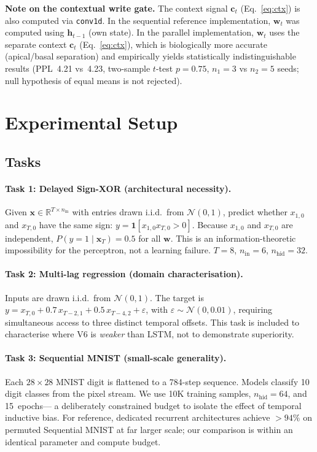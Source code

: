 \documentclass[11pt,a4paper]{article}
\begin{document}
\textbf{Note on the contextual write gate.} The context signal
$\mathbf{c}_t$
(Eq.~\ref{eq:ctx}) is also computed via \texttt{conv1d}.
In the sequential reference implementation, $\mathbf{w}_t$ was computed
using $\mathbf{h}_{t-1}$ (own state). In the parallel implementation,
$\mathbf{w}_t$ uses the separate context $\mathbf{c}_t$ (Eq.~\ref{eq:ctx}),
which is biologically more accurate (apical/basal separation) and
empirically yields statistically indistinguishable results (PPL~4.21 vs~4.23,
two-sample $t$-test $p=0.75$, $n_1=3$ vs $n_2=5$ seeds; null hypothesis of equal means
is not rejected).

\section{Experimental Setup}
\label{sec:setup}

\subsection{Tasks}
\label{sec:tasks}

\paragraph{Task 1: Delayed Sign-XOR (architectural necessity).}
Given $\mathbf{x}\in\mathbb{R}^{T\times n_\mathrm{in}}$ with entries drawn
i.i.d.\ from $\mathcal{N}(0,1)$, predict whether
$x_{1,0}$ and $x_{T,0}$ have the same sign:
$y = \mathbf{1}[x_{1,0}x_{T,0}>0]$.
Because $x_{1,0}$ and $x_{T,0}$ are independent,
$P(y=1\mid\mathbf{x}_T) = 0.5$ for all $\mathbf{w}$.
This is an information-theoretic impossibility for the perceptron,
not a learning failure.
$T=8$, $n_\mathrm{in}=6$, $n_\mathrm{hid}=32$.

\paragraph{Task 2: Multi-lag regression (domain characterisation).}
Inputs are drawn i.i.d.\ from $\mathcal{N}(0,1)$. The target is
$y = x_{T,0} + 0.7\,x_{T-2,1} + 0.5\,x_{T-4,2} + \varepsilon$,
with $\varepsilon \sim \mathcal{N}(0, 0.01)$,
requiring simultaneous access to three distinct temporal offsets.
This task is included to characterise where V6 is \emph{weaker}
than LSTM, not to demonstrate superiority.

\paragraph{Task 3: Sequential MNIST (small-scale generality).}
Each $28{\times}28$ MNIST digit \citep{lecun1998gradient} is flattened
to a 784-step sequence. Models classify 10 digit classes from the pixel
stream. We use 10K training samples, $n_\mathrm{hid}=64$, and 15~epochs---
a deliberately constrained budget to isolate the effect of temporal
inductive bias.
For reference, dedicated recurrent architectures achieve ${>}94\%$ on
permuted Sequential MNIST \citep{arjovsky2016unitary} at far larger scale;
our comparison is within an identical parameter and compute budget.
\end{document}
